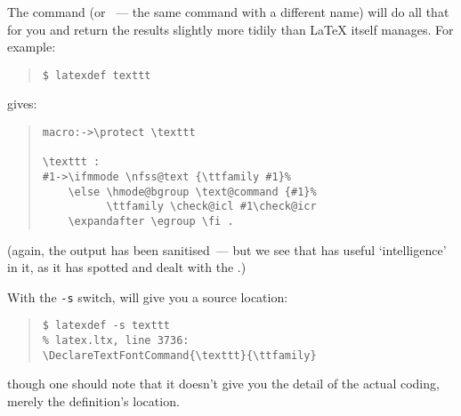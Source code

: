 The command  (or ~--- the same
command with a different name) will do all that for you and return the
results slightly more tidily than \LaTeX{} itself manages.  For
example:
\begin{quote}
\begin{verbatim}
$ latexdef texttt
\end{verbatim}
\end{quote}
gives:
\begin{quote}
\begin{verbatim}
macro:->\protect \texttt  

\texttt :
#1->\ifmmode \nfss@text {\ttfamily #1}%
    \else \hmode@bgroup \text@command {#1}%
          \ttfamily \check@icl #1\check@icr
    \expandafter \egroup \fi .
\end{verbatim}
\end{quote}
(again, the output has been sanitised~--- but we see that
 has useful `intelligence' in it, as it has spotted
and dealt with the .)

With the \texttt{-s} switch,  will give you a
source location:
\begin{quote}
\begin{verbatim}
$ latexdef -s texttt
% latex.ltx, line 3736:
\DeclareTextFontCommand{\texttt}{\ttfamily}
\end{verbatim}
\end{quote}
though one should note that it doesn't give you the detail of the
actual coding, merely the definition's location.

